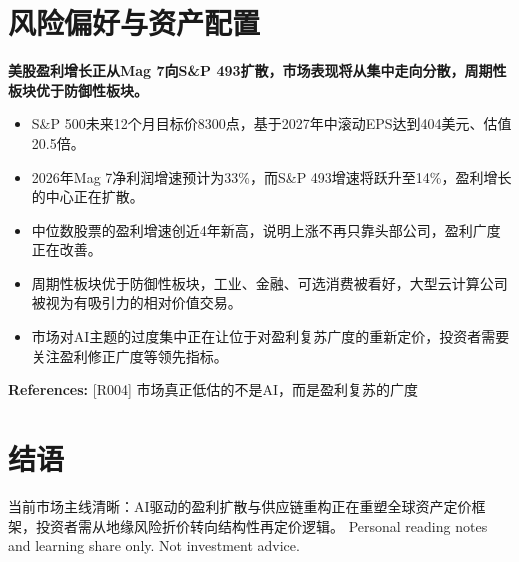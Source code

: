 \documentclass[11pt]{ctexart}
\begin{document}
\section{风险偏好与资产配置}
\textbf{美股盈利增长正从Mag 7向S\&P 493扩散，市场表现将从集中走向分散，周期性板块优于防御性板块。}

\begin{itemize}
  \item S\&P 500未来12个月目标价8300点，基于2027年中滚动EPS达到404美元、估值20.5倍。
  \item 2026年Mag 7净利润增速预计为33\%，而S\&P 493增速将跃升至14\%，盈利增长的中心正在扩散。
  \item 中位数股票的盈利增速创近4年新高，说明上涨不再只靠头部公司，盈利广度正在改善。
  \item 周期性板块优于防御性板块，工业、金融、可选消费被看好，大型云计算公司被视为有吸引力的相对价值交易。
  \item 市场对AI主题的过度集中正在让位于对盈利复苏广度的重新定价，投资者需要关注盈利修正广度等领先指标。
\end{itemize}
{\small\color{refgray}\textbf{References:} [R004] 市场真正低估的不是AI，而是盈利复苏的广度}

\section*{结语}
当前市场主线清晰：AI驱动的盈利扩散与供应链重构正在重塑全球资产定价框架，投资者需从地缘风险折价转向结构性再定价逻辑。
\vfill
{\small\color{refgray}Personal reading notes and learning share only. Not investment advice.}
\end{document}
